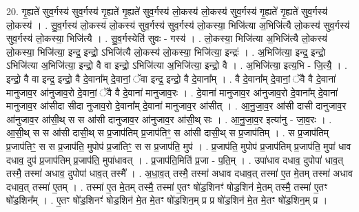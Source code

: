 \documentclass[17pt]{extarticle}
\begin{document}
20. गृ॒ह्यते॑ सुव॒र्गस्य॑ सुव॒र्गस्य॑ गृ॒ह्यते॑ गृ॒ह्यते॑ सुव॒र्गस्य॑ लो॒कस्य॑ लो॒कस्य॑ सुव॒र्गस्य॑ गृ॒ह्यते॑ गृ॒ह्यते॑ सुव॒र्गस्य॑ लो॒कस्य॑ । . सु॒व॒र्गस्य॑ लो॒कस्य॑ लो॒कस्य॑ सुव॒र्गस्य॑ सुव॒र्गस्य॑ लो॒कस्या॒ भिजि॑त्या अ॒भिजि॑त्यै लो॒कस्य॑ सुव॒र्गस्य॑ सुव॒र्गस्य॑ लो॒कस्या॒ भिजि॑त्यै । . सु॒व॒र्गस्येति॑ सुवः - गस्य॑ । . लो॒कस्या॒ भिजि॑त्या अ॒भिजि॑त्यै लो॒कस्य॑ लो॒कस्या॒ भिजि॑त्या॒ इन्द्र॒ इन्द्रो॒ ऽभिजि॑त्यै लो॒कस्य॑ लो॒कस्या॒ भिजि॑त्या॒ इन्द्रः॑ । . अ॒भिजि॑त्या॒ इन्द्र॒ इन्द्रो॒ ऽभिजि॑त्या अ॒भिजि॑त्या॒ इन्द्रो॒ वै वा इन्द्रो॒ ऽभिजि॑त्या अ॒भिजि॑त्या॒ इन्द्रो॒ वै । . अ॒भिजि॑त्या॒ इत्य॒भि - जि॒त्यै॒ । . इन्द्रो॒ वै वा इन्द्र॒ इन्द्रो॒ वै दे॒वाना᳚म् दे॒वानां॒ ॅवा इन्द्र॒ इन्द्रो॒ वै दे॒वाना᳚म् । . वै दे॒वाना᳚म् दे॒वानां॒ ॅवै वै दे॒वाना॑ मानुजाव॒र आ॑नुजाव॒रो दे॒वानां॒ ॅवै वै दे॒वाना॑ मानुजाव॒रः । . दे॒वाना॑ मानुजाव॒र आ॑नुजाव॒रो दे॒वाना᳚म् दे॒वाना॑ मानुजाव॒र आ॑सीदा सीदा नुजाव॒रो दे॒वाना᳚म् दे॒वाना॑ मानुजाव॒र आ॑सीत् । . आ॒नु॒जा॒व॒र आ॑सी दासी दानुजाव॒र आ॑नुजाव॒र आ॑सी॒थ् स स आ॑सी दानुजाव॒र आ॑नुजाव॒र आ॑सी॒थ् सः । . आ॒नु॒जा॒व॒र इत्या॑नु - जा॒व॒रः । . आ॒सी॒थ् स स आ॑सी दासी॒थ् स प्र॒जाप॑तिम् प्र॒जाप॑तिꣳ॒॒ स आ॑सी दासी॒थ् स प्र॒जाप॑तिम् । . स प्र॒जाप॑तिम् प्र॒जाप॑तिꣳ॒॒ स स प्र॒जाप॑ति॒ मुपोप॑ प्र॒जा॑तिꣳ॒॒ स स प्र॒जाप॑ति॒ मुप॑ । . प्र॒जाप॑ति॒ मुपोप॑ प्र॒जाप॑तिम् प्र॒जाप॑ति॒ मुपा॑ धाव दधाव॒ दुप॑ प्र॒जाप॑तिम् प्र॒जाप॑ति॒ मुपा॑धावत् । . प्र॒जाप॑ति॒मिति॑ प्र॒जा - प॒ति॒म् । . उपा॑धाव दधाव॒ दुपोपा॑ धाव॒त् तस्मै॒ तस्मा॑ अधाव॒ दुपोपा॑ धाव॒त् तस्मै᳚ । . अ॒धा॒व॒त् तस्मै॒ तस्मा॑ अधाव दधाव॒त् तस्मा॑ ए॒त मे॒तम् तस्मा॑ अधाव दधाव॒त् तस्मा॑ ए॒तम् । . तस्मा॑ ए॒त मे॒तम् तस्मै॒ तस्मा॑ ए॒तꣳ षो॑ड॒शिनꣳ॑ षोड॒शिन॑ मे॒तम् तस्मै॒ तस्मा॑ ए॒तꣳ षो॑ड॒शिन᳚म् । . ए॒तꣳ षो॑ड॒शिनꣳ॑ षोड॒शिन॑ मे॒त मे॒तꣳ षो॑ड॒शिन॒म् प्र प्र षो॑ड॒शिन॑ मे॒त मे॒तꣳ षो॑ड॒शिन॒म् प्र । \newline
\end{document}
